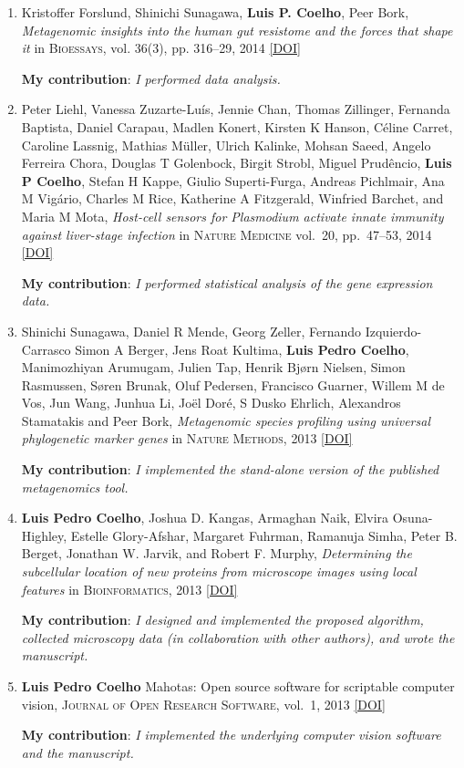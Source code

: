 \documentclass{article}
\newcommand\showdoi[1]{%
    \href{http://dx.doi.org/#1}{[DOI]}%
}
\newcommand\pubname[1]{\textsc{#1}}
\newcommand\contribution[1]{\relax\hfill\break\textbf{My contribution}: \textit{#1}}
\begin{document}
\begin{enumerate}[resume]
\item Kristoffer Forslund, Shinichi Sunagawa, \textbf{Luis P. Coelho}, Peer
Bork, \emph{Metagenomic insights into the human gut resistome and the forces that
shape it} in \pubname{Bioessays}, vol. 36(3), pp. 316--29, 2014
\showdoi{10.1002/bies.201300143}
\contribution{I performed data analysis.}

\item Peter Liehl, Vanessa Zuzarte-Luís, Jennie Chan, Thomas Zillinger,
Fernanda Baptista, Daniel Carapau, Madlen Konert, Kirsten K Hanson, Céline
Carret, Caroline Lassnig, Mathias Müller, Ulrich Kalinke, Mohsan Saeed,
Angelo Ferreira Chora, Douglas T Golenbock, Birgit Strobl, Miguel Prudêncio,
\textbf{Luis P Coelho}, Stefan H Kappe, Giulio Superti-Furga, Andreas
Pichlmair, Ana M Vigário, Charles M Rice, Katherine A Fitzgerald, Winfried
Barchet, and Maria M Mota, \emph{Host-cell sensors for Plasmodium activate
innate immunity against liver-stage infection} in \pubname{Nature Medicine}
vol.\ 20, pp.\ 47--53, 2014 \showdoi{10.1038/nm.3424}
\contribution{I performed statistical analysis of the gene expression data.}

\item Shinichi Sunagawa, Daniel R Mende, Georg Zeller, Fernando
Izquierdo-Carrasco Simon A Berger, Jens Roat Kultima, \textbf{Luis Pedro
Coelho}, Manimozhiyan Arumugam, Julien Tap, Henrik Bjørn Nielsen, Simon
Rasmussen, Søren Brunak, Oluf Pedersen, Francisco Guarner, Willem M de Vos,
Jun Wang, Junhua Li, Joël Doré, S Dusko Ehrlich, Alexandros Stamatakis and
Peer Bork, \emph{Metagenomic species profiling using universal phylogenetic
marker genes} in \pubname{Nature Methods}, 2013 \showdoi{10.1038/nmeth.2693}
\contribution{I implemented the stand-alone version of the published metagenomics tool.}

\item \textbf{Luis Pedro Coelho}, Joshua D. Kangas, Armaghan Naik, Elvira
Osuna-Highley, Estelle Glory-Afshar, Margaret Fuhrman, Ramanuja Simha, Peter B.
Berget, Jonathan W. Jarvik, and Robert F. Murphy, \emph{Determining the
subcellular location of new proteins from microscope images using local
features} in \pubname{Bioinformatics}, 2013 \showdoi{10.1093/bioinformatics/btt392}
\contribution{I designed and implemented the proposed algorithm, collected
microscopy data (in collaboration with other authors), and wrote the
manuscript.}

\item \textbf{Luis Pedro Coelho} Mahotas: Open source software for scriptable
computer vision, \pubname{Journal of Open Research Software}, vol.\ 1, 2013
\showdoi{10.5334/jors.ac}
\contribution{I implemented the underlying computer vision software and the manuscript.}


\end{enumerate}
\end{document}
